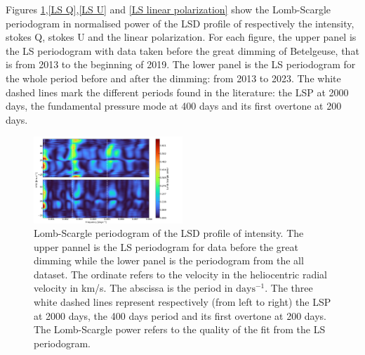 \documentclass{aa}
\begin{document}

Figures \ref{LS intensity},\ref{LS Q},\ref{LS U} and \ref{LS linear polarization} show the Lomb-Scargle periodogram in normalised power of the LSD profile of respectively 
the intensity, stokes Q, stokes U and the linear polarization. 
For each figure, the upper panel is the LS periodogram with data taken before the great dimming of Betelgeuse, that is from 2013 to the beginning of 2019. 
The lower panel is the LS periodogram for the whole period before and after the dimming: from 2013 to 2023. The white dashed lines mark the different 
periods found in the literature: the LSP at 2000 days, the fundamental pressure mode at 400 days and its first overtone at 200 days.  

\begin{figure}[!h]
    \centering
    \includegraphics[width=0.5\textwidth]{Lomb-Scargle Intensity.png}
    \caption{Lomb-Scargle periodogram of the LSD profile of intensity. 
    The upper pannel is the LS periodogram for data before the great dimming while the lower panel is the periodogram from the all dataset.
    The ordinate refers to the velocity in the heliocentric radial velocity in km/s. The abscissa is the period in $\mathrm{days^{-1}}$. 
    The three white dashed lines represent respectively (from left to right) the LSP at 2000 days, the 400 days period and its first overtone at 200 days. 
    The Lomb-Scargle power refers to the quality of the fit from the LS periodogram. }
    \label{LS intensity}
\end{figure}
\end{document}
